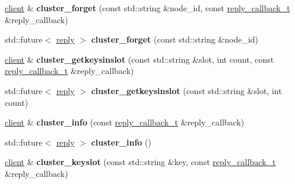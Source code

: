 \begin{DoxyCompactItemize}
\item 
\mbox{\label{classcpp__redis_1_1client_aea8a77acb9031fd03f8ab5dc2c09a17d}} 
\hyperlink{classcpp__redis_1_1client}{client} \& {\bfseries cluster\+\_\+forget} (const std\+::string \&node\+\_\+id, const \hyperlink{classcpp__redis_1_1client_a061a1140d36d2eaeda82b09a0bb3f9f2}{reply\+\_\+callback\+\_\+t} \&reply\+\_\+callback)
\item 
\mbox{\label{classcpp__redis_1_1client_a58457400352dee764066bd9f737f667a}} 
std\+::future$<$ \hyperlink{classcpp__redis_1_1reply}{reply} $>$ {\bfseries cluster\+\_\+forget} (const std\+::string \&node\+\_\+id)
\item 
\mbox{\label{classcpp__redis_1_1client_a716e31987800e3ca5483f72972fecfb0}} 
\hyperlink{classcpp__redis_1_1client}{client} \& {\bfseries cluster\+\_\+getkeysinslot} (const std\+::string \&slot, int count, const \hyperlink{classcpp__redis_1_1client_a061a1140d36d2eaeda82b09a0bb3f9f2}{reply\+\_\+callback\+\_\+t} \&reply\+\_\+callback)
\item 
\mbox{\label{classcpp__redis_1_1client_ad644ef5c24f3eb51de30a827753cc077}} 
std\+::future$<$ \hyperlink{classcpp__redis_1_1reply}{reply} $>$ {\bfseries cluster\+\_\+getkeysinslot} (const std\+::string \&slot, int count)
\item 
\mbox{\label{classcpp__redis_1_1client_a831d52a9dc9115e817bae15db0fb18a6}} 
\hyperlink{classcpp__redis_1_1client}{client} \& {\bfseries cluster\+\_\+info} (const \hyperlink{classcpp__redis_1_1client_a061a1140d36d2eaeda82b09a0bb3f9f2}{reply\+\_\+callback\+\_\+t} \&reply\+\_\+callback)
\item 
\mbox{\label{classcpp__redis_1_1client_a993170e08c425a810fa757bd4c202d10}} 
std\+::future$<$ \hyperlink{classcpp__redis_1_1reply}{reply} $>$ {\bfseries cluster\+\_\+info} ()
\item 
\mbox{\label{classcpp__redis_1_1client_ae0314fc2697674f4be4fca1cc5cbd4a1}} 
\hyperlink{classcpp__redis_1_1client}{client} \& {\bfseries cluster\+\_\+keyslot} (const std\+::string \&key, const \hyperlink{classcpp__redis_1_1client_a061a1140d36d2eaeda82b09a0bb3f9f2}{reply\+\_\+callback\+\_\+t} \&reply\+\_\+callback)

\end{DoxyCompactItemize}
